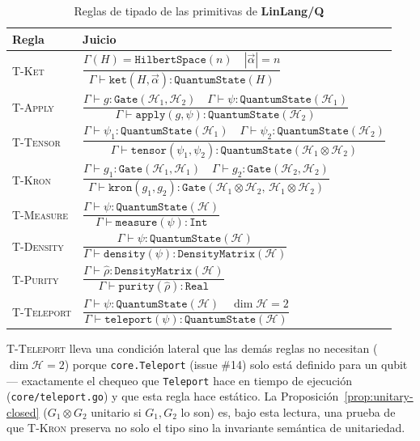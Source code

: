 \documentclass[12pt, a4paper, openany]{report}
\theoremstyle{definition}
\newcommand{\linlangQ}{\textbf{LinLang/Q}}
\newcommand{\Hilbert}{\mathcal{H}}
\newcommand{\density}{\hat{\rho}}
\begin{document}
\begin{table}[H]
\centering
\caption{Reglas de tipado de las primitivas de \linlangQ{}}
\label{tab:reglas-tipado}
\renewcommand{\arraystretch}{1.6}
\begin{tabularx}{\linewidth}{@{}L{5.3cm}X@{}}
\toprule
\textbf{Regla} & \textbf{Juicio} \\
\midrule
\textsc{T-Ket} &
$\dfrac{\Gamma(H) = \mathtt{HilbertSpace}(n) \quad |\vec\alpha| = n}{\Gamma \vdash \mathtt{ket}(H,\vec\alpha) : \mathtt{QuantumState}(H)}$ \\
\addlinespace
\textsc{T-Apply} &
$\dfrac{\Gamma \vdash g : \mathtt{Gate}(\Hilbert_1,\Hilbert_2) \quad \Gamma \vdash \psi : \mathtt{QuantumState}(\Hilbert_1)}{\Gamma \vdash \mathtt{apply}(g,\psi) : \mathtt{QuantumState}(\Hilbert_2)}$ \\
\addlinespace
\textsc{T-Tensor} &
$\dfrac{\Gamma \vdash \psi_1 : \mathtt{QuantumState}(\Hilbert_1) \quad \Gamma \vdash \psi_2 : \mathtt{QuantumState}(\Hilbert_2)}{\Gamma \vdash \mathtt{tensor}(\psi_1,\psi_2) : \mathtt{QuantumState}(\Hilbert_1 \otimes \Hilbert_2)}$ \\
\addlinespace
\textsc{T-Kron} &
$\dfrac{\Gamma \vdash g_1 : \mathtt{Gate}(\Hilbert_1,\Hilbert_1) \quad \Gamma \vdash g_2 : \mathtt{Gate}(\Hilbert_2,\Hilbert_2)}{\Gamma \vdash \mathtt{kron}(g_1,g_2) : \mathtt{Gate}(\Hilbert_1{\otimes}\Hilbert_2,\, \Hilbert_1{\otimes}\Hilbert_2)}$ \\
\addlinespace
\textsc{T-Measure} &
$\dfrac{\Gamma \vdash \psi : \mathtt{QuantumState}(\Hilbert)}{\Gamma \vdash \mathtt{measure}(\psi) : \mathtt{Int}}$ \\
\addlinespace
\textsc{T-Density} &
$\dfrac{\Gamma \vdash \psi : \mathtt{QuantumState}(\Hilbert)}{\Gamma \vdash \mathtt{density}(\psi) : \mathtt{DensityMatrix}(\Hilbert)}$ \\
\addlinespace
\textsc{T-Purity} &
$\dfrac{\Gamma \vdash \density : \mathtt{DensityMatrix}(\Hilbert)}{\Gamma \vdash \mathtt{purity}(\density) : \mathtt{Real}}$ \\
\addlinespace
\textsc{T-Teleport} &
$\dfrac{\Gamma \vdash \psi : \mathtt{QuantumState}(\Hilbert) \quad \dim \Hilbert = 2}{\Gamma \vdash \mathtt{teleport}(\psi) : \mathtt{QuantumState}(\Hilbert)}$ \\
\bottomrule
\end{tabularx}
\end{table}

\textsc{T-Teleport} lleva una condición lateral que las demás reglas no necesitan ($\dim\Hilbert = 2$) porque \texttt{core.Teleport} (issue \#14) solo está definido para un qubit — exactamente el chequeo que \texttt{Teleport} hace en tiempo de ejecución (\texttt{core/teleport.go}) y que esta regla hace estático. La Proposición~\ref{prop:unitary-closed} ($G_1\otimes G_2$ unitario si $G_1,G_2$ lo son) es, bajo esta lectura, una prueba de que \textsc{T-Kron} preserva no solo el tipo sino la invariante semántica de unitariedad.
\end{document}
